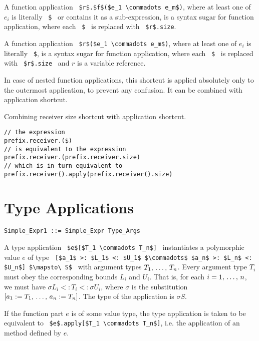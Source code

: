 A function application ~\lstinline!$r$.$f$($e_1 \commadots e_m$)!, where at least one of $e_i$ is literally ~\lstinline[mathescape=false]!$!~ or contains it as a sub-expression, is a syntax sugar for function application, where each ~\lstinline[mathescape=false]!$!~ is replaced with ~\lstinline!$r$.size!. 

A function application ~\lstinline!$r$($e_1 \commadots e_m$)!, where at least one of $e_i$ is literally ~\lstinline[mathescape=false]!$!, is a syntax sugar for function application, where each ~\lstinline[mathescape=false]!$!~ is replaced with ~\lstinline!$r$.size!~ and $r$ is a variable reference. 

In case of nested function applications, this shortcut is applied absolutely only to the outermost application, to prevent any confusion. It can be combined with application shortcut.

\example Combining receiver size shortcut with application shortcut.
\begin{lstlisting}[mathescape=false]
// the expression
prefix.receiver.($)
// is equivalent to the expression
prefix.receiver.(prefix.receiver.size)
// which is in turn equivalent to
prefix.receiver().apply(prefix.receiver().size)
\end{lstlisting}





\section{Type Applications}
\label{sec:type-applications}

\syntax\begin{lstlisting}
Simple_Expr1 ::= Simple_Expr Type_Args
\end{lstlisting}

A type application ~\lstinline!$e$[$T_1 \commadots T_n$]!~ instantiates a polymorphic value $e$ of type ~\lstinline![$a_1$ >: $L_1$ <: $U_1$ $\commadots$ $a_n$ >: $L_n$ <: $U_n$] $\mapsto\ S$!~ with argument types $T_1 ,\, \ldots ,\, T_n$. Every argument type $T_i$ must obey the corresponding bounds $L_i$ and $U_i$. That is, for each $i = 1 ,\, \ldots ,\, n$, we must have $\sigma L_i <: T_i <: \sigma U_i$, where $\sigma$ is the substitution $[a_1 := T_1 ,\, \ldots ,\, a_n := T_n]$. The type of the application is $\sigma S$. 

If the function part $e$ is of some value type, the type application is taken to be equivalent to ~\lstinline!$e$.apply[$T_1 \commadots T_n$]!, i.e. the application of an  method defined by $e$. 

